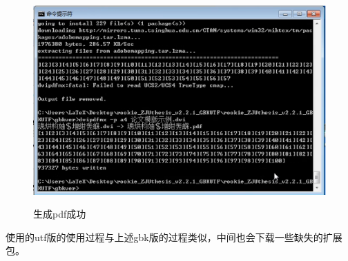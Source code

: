\begin{figure}[th]
	\centering
	\includegraphics[scale=0.5]{./Pictures/complete.eps}\\
	\caption{生成pdf成功}
	\label{complete}
\end{figure}

使用\XeTeX 的utf版的使用过程与上述gbk版的过程类似，中间也会下载一些缺失的扩展包。